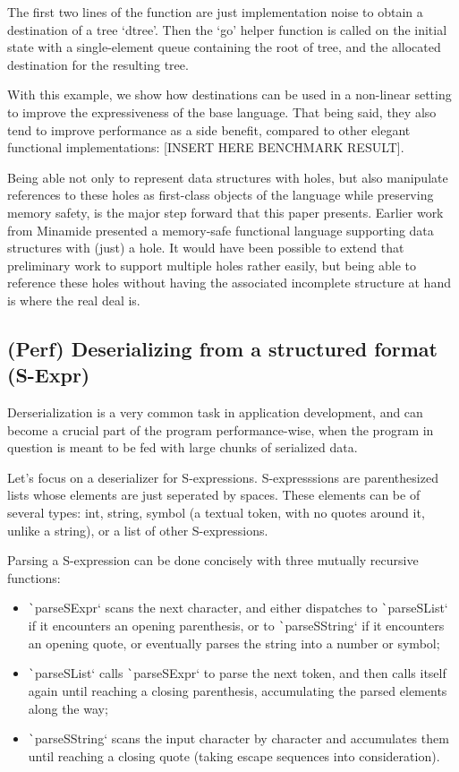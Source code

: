 \documentclass[english]{jflart}
\begin{document}
The first two lines of the function are just implementation noise to obtain a destination of a tree `dtree'. Then the `go' helper function is called on the initial state with a single-element queue containing the root of tree, and the allocated destination for the resulting tree.

With this example, we show how destinations can be used in a non-linear setting to improve the expressiveness of the base language. That being said, they also tend to improve performance as a side benefit, compared to other elegant functional implementations: [INSERT HERE BENCHMARK RESULT].

Being able not only to represent data structures with holes, but also manipulate references to these holes as first-class objects of the language while preserving memory safety, is the major step forward that this paper presents. Earlier work from Minamide presented a memory-safe functional language supporting data structures with (just) a hole. It would have been possible to extend that preliminary work to support multiple holes rather easily, but being able to reference these holes without having the associated incomplete structure at hand is where the real deal is.

\subsection{(Perf) Deserializing from a structured format (S-Expr)}

Derserialization is a very common task in application development, and can become a crucial part of the program performance-wise, when the program in question is meant to be fed with large chunks of serialized data.

Let's focus on a deserializer for S-expressions. S-expresssions are parenthesized lists whose elements are just seperated by spaces. These elements can be of several types: int, string, symbol (a textual token, with no quotes around it, unlike a string), or a list of other S-expressions.

Parsing a S-expression can be done concisely with three mutually recursive functions:
\begin{itemize}
  \item \texttt`parseSExpr` scans the next character, and either dispatches to \texttt`parseSList` if it encounters an opening parenthesis, or to \texttt`parseSString` if it encounters an opening quote, or eventually parses the string into a number or symbol;
  \item \texttt`parseSList` calls \texttt`parseSExpr` to parse the next token, and then calls itself again until reaching a closing parenthesis, accumulating the parsed elements along the way;
  \item \texttt`parseSString` scans the input character by character and accumulates them until reaching a closing quote (taking escape sequences into consideration).
\end{itemize}
\end{document}
